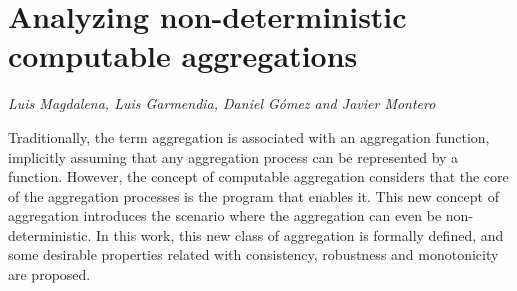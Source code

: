\documentclass[../booklet.tex]{subfiles}
\begin{document}
\section[Analyzing non-deterministic computable aggregations. {\it Luis Magdalena, Luis Garmendia, Daniel Gómez and Javier Montero}]{Analyzing non-deterministic computable aggregations}
   

\begin{center}
  {\it Luis Magdalena, Luis Garmendia, Daniel Gómez and Javier Montero}
\end{center}

\vskip 0.8cm



Traditionally, the term aggregation is associated with an aggregation function, implicitly assuming that any aggregation process can be represented by a function. However, the concept of computable aggregation considers that the core of the aggregation processes is the program that enables it. This new concept of aggregation introduces the scenario where the aggregation can even be non-deterministic. In this work, this new class of aggregation is formally defined, and some desirable properties related with consistency, robustness and monotonicity are proposed.  

\end{document}

